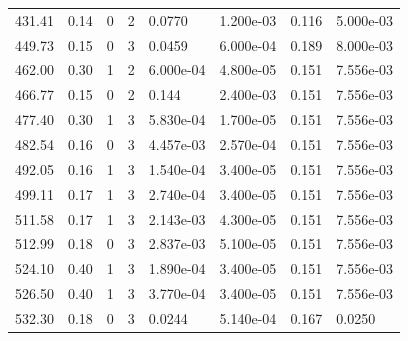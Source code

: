 \documentclass[preview]{standalone}
\begin{document}
{{{\begin{tabular}{L{1.2cm}C{1.2cm} C{0.3cm}C{0.5cm} C{1.4cm}C{1.4cm} C{1.4cm}C{1.4cm}}
  431.41  &  0.14  & 0     &  2 &  0.0770  & 1.200e-03  & 0.116 &  5.000e-03   \\ 
  449.73  &  0.15  & 0     &  3 &  0.0459  & 6.000e-04  & 0.189 &  8.000e-03   \\ 
  462.00  &  0.30  & 1     &  2 &  6.000e-04  & 4.800e-05  & 0.151 &  7.556e-03   \\ 
  466.77  &  0.15  & 0     &  2 &  0.144  & 2.400e-03  & 0.151 &  7.556e-03   \\ 
  477.40  &  0.30  & 1     &  3 &  5.830e-04  & 1.700e-05  & 0.151 &  7.556e-03   \\ 
  482.54  &  0.16  & 0     &  3 &  4.457e-03  & 2.570e-04  & 0.151 &  7.556e-03   \\ 
  492.05  &  0.16  & 1     &  3 &  1.540e-04  & 3.400e-05  & 0.151 &  7.556e-03   \\ 
  499.11  &  0.17  & 1     &  3 &  2.740e-04  & 3.400e-05  & 0.151 &  7.556e-03   \\ 
  511.58  &  0.17  & 1     &  3 &  2.143e-03  & 4.300e-05  & 0.151 &  7.556e-03   \\ 
  512.99  &  0.18  & 0     &  3 &  2.837e-03  & 5.100e-05  & 0.151 &  7.556e-03   \\ 
  524.10  &  0.40  & 1     &  3 &  1.890e-04  & 3.400e-05  & 0.151 &  7.556e-03   \\ 
  526.50  &  0.40  & 1     &  3 &  3.770e-04  & 3.400e-05  & 0.151 &  7.556e-03   \\ 
  532.30  &  0.18  & 0     &  3 &  0.0244  & 5.140e-04  & 0.167 &  0.0250   \\ 
\hline 
\end{tabular} 

}}}
\end{document}
